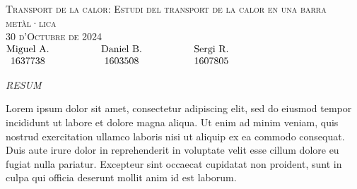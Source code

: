 \documentclass[12pt,twosides,onecolumn,openany]{article}
\begin{document}
\begin{center}
    {\Large \textsc{Transport de la calor: Estudi del transport de la calor en una barra metàl·lica}}\\
    \vspace{0.2cm}
    \textsc{30 d'Octubre de 2024}\\
    \vspace{0.2cm}
    $\begin{matrix} 
    \text{Miguel A.} \hspace{1.5cm} & \text{Daniel B.} & \hspace{1.5cm} \text{Sergi R.}\\1637738 \hspace{1.5cm} & 1603508 & \hspace{1.5cm} 1607805
    \end{matrix}$
\end{center}
\begin{center}
    \textsc{\textit{RESUM}}
\end{center}
Lorem ipsum dolor sit amet, consectetur adipiscing elit, sed do eiusmod tempor incididunt ut labore et dolore magna aliqua. Ut enim ad minim veniam, quis nostrud exercitation ullamco laboris nisi ut aliquip ex ea commodo consequat. Duis aute irure dolor in reprehenderit in voluptate velit esse cillum dolore eu fugiat nulla pariatur. Excepteur sint occaecat cupidatat non proident, sunt in culpa qui officia deserunt mollit anim id est laborum. \cite{prueba}
\vspace{0.5cm}
\end{document}
